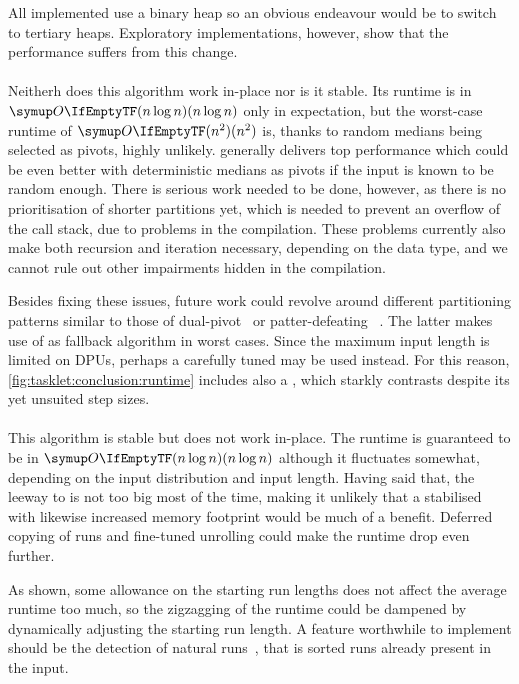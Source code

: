 All implemented \HS*{} use a binary heap so an obvious endeavour would be to switch to tertiary heaps.
Exploratory implementations, however, show that the performance suffers from this change.


\paragraph{\QS{}}
Neitherh does this algorithm work in-place nor is it stable.
Its runtime is in \(\bigoh{n \log n}\) only in expectation, but the worst-case runtime of \(\bigoh{n^2}\) is, thanks to random medians being selected as pivots, highly unlikely.
\QS{} generally delivers top performance which could be even better with deterministic medians as pivots if the input is known to be random enough.
There is serious work needed to be done, however, as there is no prioritisation of shorter partitions yet, which is needed to prevent an overflow of the call stack, due to problems in the compilation.
These problems currently also make both recursion and iteration necessary, depending on the data type, and we cannot rule out other impairments hidden in the compilation.

Besides fixing these issues, future work could revolve around different partitioning patterns similar to those of dual-pivot~\cite{wild2012averagecase} or patter-defeating \QS{}~\cite{peters2021patterndefeatingquicksort}.
The latter makes use of \HS{} as fallback algorithm in worst cases.
Since the maximum input length is limited on DPUs, perhaps a carefully tuned \ShS{} may be used instead.
For this reason, \cref{fig:tasklet:conclusion:runtime} includes also a \ShS{}, which starkly contrasts \HS{} despite its yet unsuited step sizes.


\paragraph{\MS{}}
This algorithm is stable but does not work in-place.
The runtime is guaranteed to be in \(\bigoh{n \log n}\) although it fluctuates somewhat, depending on the input distribution and input length.
Having said that, the leeway to \QS{} is not too big most of the time, making it unlikely that a stabilised \QS{} with likewise increased memory footprint would be much of a benefit.
Deferred copying of runs and fine-tuned unrolling could make the runtime drop even further.

As shown, some allowance on the starting run lengths does not affect the average runtime too much, so the zigzagging of the runtime could be dampened by dynamically adjusting the starting run length.
A feature worthwhile to implement should be the detection of natural runs~\cite[Chapter~2.3.2]{wirth1975algorithmen}, that is sorted runs already present in the input.

